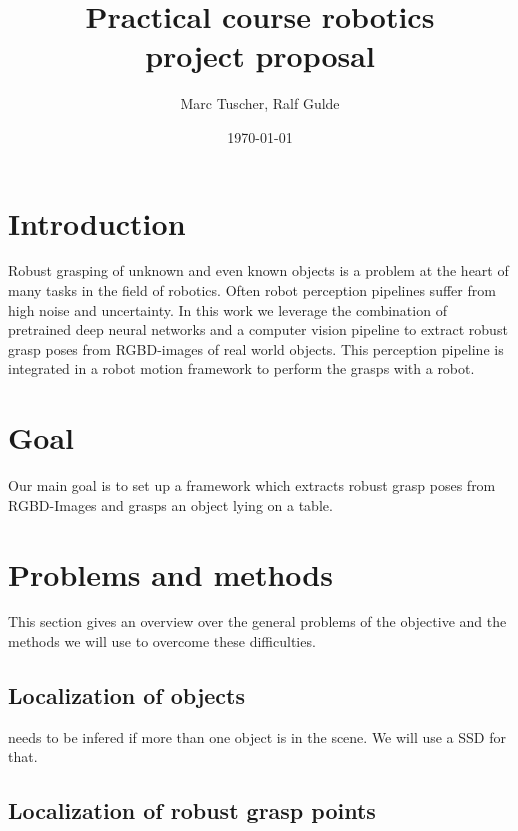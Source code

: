 \documentclass[a4paper]{article}
\title{Practical course robotics \\ project proposal}
\author{Marc Tuscher, Ralf Gulde}
\date{\today}
\begin{document}
\maketitle

\section{Introduction}
Robust grasping of unknown and even known objects is a problem at the heart of many tasks in the field of robotics.
Often robot perception pipelines suffer from high noise and uncertainty.
In this work we leverage the combination of pretrained deep neural networks and a computer vision pipeline to extract robust grasp poses from RGBD-images of real world objects.
This perception pipeline is integrated in a robot motion framework to perform the grasps with a robot. 

\section{Goal}
Our main goal is to set up a framework which extracts robust grasp poses from RGBD-Images and grasps an object lying on a table.

\section{Problems and methods}
This section gives an overview over the general problems of the objective and the methods we will use to overcome these difficulties.
\subsection{Localization of objects}
needs to be infered if more than one object is in the scene. We will use a 
SSD for that.

\subsection{Localization of robust grasp points}
\end{document}
